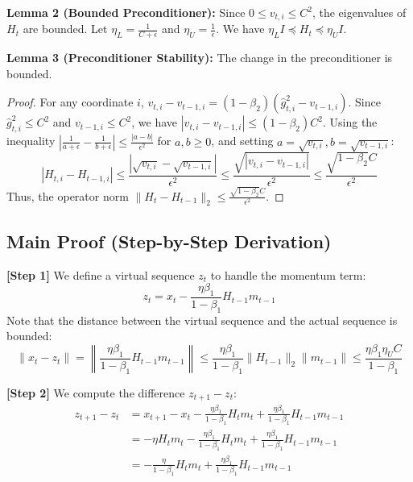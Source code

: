 \documentclass{article}
\begin{document}
\textbf{Lemma 2 (Bounded Preconditioner):} Since $0 \leq v_{t,i} \leq C^2$, the eigenvalues of $H_t$ are bounded. Let $\eta_L = \frac{1}{C+\epsilon}$ and $\eta_U = \frac{1}{\epsilon}$. We have $\eta_L I \preceq H_t \preceq \eta_U I$.

\textbf{Lemma 3 (Preconditioner Stability):} The change in the preconditioner is bounded.
\begin{proof}
    For any coordinate $i$, $v_{t,i} - v_{t-1,i} = (1-\beta_2)(\hat{g}_{t,i}^2 - v_{t-1,i})$. Since $\hat{g}_{t,i}^2 \leq C^2$ and $v_{t-1,i} \leq C^2$, we have $|v_{t,i} - v_{t-1,i}| \leq (1-\beta_2)C^2$. 
    Using the inequality $|\frac{1}{a+\epsilon} - \frac{1}{b+\epsilon}| \leq \frac{|a-b|}{\epsilon^2}$ for $a,b \geq 0$, and setting $a=\sqrt{v_{t,i}}, b=\sqrt{v_{t-1,i}}$:
    \begin{equation}
        |H_{t,i} - H_{t-1,i}| \leq \frac{|\sqrt{v_{t,i}} - \sqrt{v_{t-1,i}}|}{\epsilon^2} \leq \frac{\sqrt{|v_{t,i} - v_{t-1,i}|}}{\epsilon^2} \leq \frac{\sqrt{1-\beta_2} C}{\epsilon^2}
    \end{equation}
    Thus, the operator norm $\|H_t - H_{t-1}\|_2 \leq \frac{\sqrt{1-\beta_2} C}{\epsilon^2}$.
\end{proof}

\subsection*{Main Proof (Step-by-Step Derivation)}

\textbf{[Step 1]} We define a virtual sequence $z_t$ to handle the momentum term:
\begin{equation}
    z_t = x_t - \frac{\eta \beta_1}{1-\beta_1} H_{t-1} m_{t-1}
\end{equation}
Note that the distance between the virtual sequence and the actual sequence is bounded:
\begin{equation}
    \|x_t - z_t\| = \left\| \frac{\eta \beta_1}{1-\beta_1} H_{t-1} m_{t-1} \right\| \leq \frac{\eta \beta_1}{1-\beta_1} \|H_{t-1}\|_2 \|m_{t-1}\| \leq \frac{\eta \beta_1 \eta_U C}{1-\beta_1} \label{eq:dist_xz}
\end{equation}

\textbf{[Step 2]} We compute the difference $z_{t+1} - z_t$:
\begin{align}
    z_{t+1} - z_t &= x_{t+1} - x_t - \frac{\eta \beta_1}{1-\beta_1} H_t m_t + \frac{\eta \beta_1}{1-\beta_1} H_{t-1} m_{t-1} \nonumber \\
    &= - \eta H_t m_t - \frac{\eta \beta_1}{1-\beta_1} H_t m_t + \frac{\eta \beta_1}{1-\beta_1} H_{t-1} m_{t-1} \nonumber \\
    &= - \frac{\eta}{1-\beta_1} H_t m_t + \frac{\eta \beta_1}{1-\beta_1} H_{t-1} m_{t-1}
\end{align}
\end{document}
